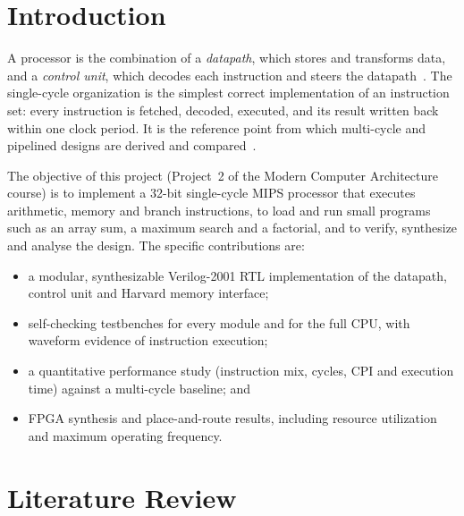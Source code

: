 \documentclass[conference]{IEEEtran}
\begin{document}
\section{Introduction}
A processor is the combination of a \emph{datapath}, which stores and
transforms data, and a \emph{control unit}, which decodes each instruction and
steers the datapath~\cite{patterson2014cod}. The single-cycle organization is
the simplest correct implementation of an instruction set: every instruction
is fetched, decoded, executed, and its result written back within one clock
period. It is the reference point from which multi-cycle and pipelined
designs are derived and compared~\cite{hennessy2019caqa}.

The objective of this project (Project~2 of the Modern Computer Architecture
course) is to implement a 32-bit single-cycle MIPS processor that executes
arithmetic, memory and branch instructions, to load and run small programs
such as an array sum, a maximum search and a factorial, and to verify,
synthesize and analyse the design. The specific contributions are:
\begin{itemize}
  \item a modular, synthesizable Verilog-2001 RTL implementation of the
        datapath, control unit and Harvard memory interface;
  \item self-checking testbenches for every module and for the full CPU, with
        waveform evidence of instruction execution;
  \item a quantitative performance study (instruction mix, cycles, CPI and
        execution time) against a multi-cycle baseline; and
  \item FPGA synthesis and place-and-route results, including resource
        utilization and maximum operating frequency.
\end{itemize}

\section{Literature Review}
\end{document}
